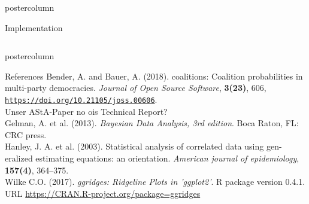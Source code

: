 \documentclass[final,hyperref={pdfpagelabels=false}]{beamer}
\newcommand*\circled[1]{\tikz[baseline=(char.base)]{
\node[shape=circle,draw,inner sep=2pt] (char) {#1};}}
\begin{document}
\begin{frame}
\begin{columns}
\begin{column}{1\textwidth}
\begin{columns}[T]
\begin{column}{.484\textwidth}
\begin{beamercolorbox}[center,wd=\textwidth]{postercolumn}
\begin{minipage}[T]{.95\textwidth}
\begin{block}{\footnotesize \circled{3} Implementation}
% 
\end{block}


\end{minipage}
\end{beamercolorbox}
\end{column}

\begin{column}{.016\textwidth}
\end{column}

\end{columns}


\vspace{2ex}
\begin{beamercolorbox}[center,wd=\textwidth]{postercolumn}
\begin{minipage}[T]{.95\textwidth}  %
\begin{block}{\footnotesize References}
{\footnotesize
Bender, A. and Bauer, A. (2018). coalitions: Coalition probabilities in multi-party democracies.
\textit{Journal of Open Source Software}, \textbf{3(23)}, 606,
\href{https://doi.org/10.21105/joss.00606}{\texttt{https://doi.org/10.21105/joss.00606}}. \\
Unser AStA-Paper no ois Technical Report? \\
Gelman, A. et al. (2013). \textit{Bayesian Data Analysis, 3rd edition}. Boca Raton, FL: CRC press. \\
Hanley, J. A. et al. (2003). Statistical analysis of correlated data using gen-
eralized estimating equations: an orientation. \textit{American journal of epidemiology},
\textbf{157(4)}, 364--375. \\
Wilke C.O. (2017). \textit{ggridges: Ridgeline Plots in 'ggplot2'}. R package version
0.4.1. URL \href{https://CRAN.R-project.org/package=ggridges}{https://CRAN.R-project.org/package=ggridges}
}
\end{block}
\end{minipage}
\end{beamercolorbox}

\end{column} %
\end{columns}
\end{frame}
\end{document}
